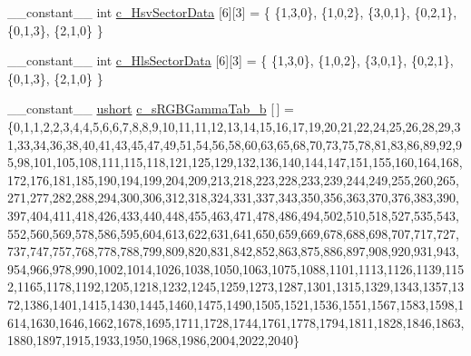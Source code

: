 \begin{DoxyCompactItemize}
\item 
\-\_\-\-\_\-constant\-\_\-\-\_\- int \hyperlink{namespacecv_1_1gpu_1_1device_1_1color__detail_a861e8aa3b3c482b9a62dce1125486af7}{c\-\_\-\-Hsv\-Sector\-Data} \mbox{[}6\mbox{]}\mbox{[}3\mbox{]} = \{ \{1,3,0\}, \{1,0,2\}, \{3,0,1\}, \{0,2,1\}, \{0,1,3\}, \{2,1,0\} \}
\item 
\-\_\-\-\_\-constant\-\_\-\-\_\- int \hyperlink{namespacecv_1_1gpu_1_1device_1_1color__detail_afec4abf631a0b58ee4cb02fe320af62e}{c\-\_\-\-Hls\-Sector\-Data} \mbox{[}6\mbox{]}\mbox{[}3\mbox{]} = \{ \{1,3,0\}, \{1,0,2\}, \{3,0,1\}, \{0,2,1\}, \{0,1,3\}, \{2,1,0\} \}
\item 
\-\_\-\-\_\-constant\-\_\-\-\_\- \hyperlink{core_2types__c_8h_ab95f123a6c9bcfee6a343170ef8c5f69}{ushort} \hyperlink{namespacecv_1_1gpu_1_1device_1_1color__detail_a472aefd281c89f369b6bf21d0ce89ed3}{c\-\_\-s\-R\-G\-B\-Gamma\-Tab\-\_\-b} \mbox{[}$\,$\mbox{]} = \{0,1,1,2,2,3,4,4,5,6,6,7,8,8,9,10,11,11,12,13,14,15,16,17,19,20,21,22,24,25,26,28,29,31,33,34,36,38,40,41,43,45,47,49,51,54,56,58,60,63,65,68,70,73,75,78,81,83,86,89,92,95,98,101,105,108,111,115,118,121,125,129,132,136,140,144,147,151,155,160,164,168,172,176,181,185,190,194,199,204,209,213,218,223,228,233,239,244,249,255,260,265,271,277,282,288,294,300,306,312,318,324,331,337,343,350,356,363,370,376,383,390,397,404,411,418,426,433,440,448,455,463,471,478,486,494,502,510,518,527,535,543,552,560,569,578,586,595,604,613,622,631,641,650,659,669,678,688,698,707,717,727,737,747,757,768,778,788,799,809,820,831,842,852,863,875,886,897,908,920,931,943,954,966,978,990,1002,1014,1026,1038,1050,1063,1075,1088,1101,1113,1126,1139,1152,1165,1178,1192,1205,1218,1232,1245,1259,1273,1287,1301,1315,1329,1343,1357,1372,1386,1401,1415,1430,1445,1460,1475,1490,1505,1521,1536,1551,1567,1583,1598,1614,1630,1646,1662,1678,1695,1711,1728,1744,1761,1778,1794,1811,1828,1846,1863,1880,1897,1915,1933,1950,1968,1986,2004,2022,2040\}
\item 

\end{DoxyCompactItemize}
